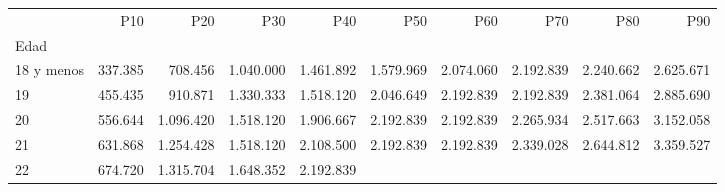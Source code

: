\begin{tabular}{llllllllll}
\cline{1-10}
\multicolumn{1}{c}{} &
  \multicolumn{1}{|r}{P10} &
  \multicolumn{1}{r}{P20} &
  \multicolumn{1}{r}{P30} &
  \multicolumn{1}{r}{P40} &
  \multicolumn{1}{r}{P50} &
  \multicolumn{1}{r}{P60} &
  \multicolumn{1}{r}{P70} &
  \multicolumn{1}{r}{P80} &
  \multicolumn{1}{r}{P90} \\
\cline{1-10}
\multicolumn{1}{l}{Edad} &
  \multicolumn{1}{|r}{} &
  \multicolumn{1}{r}{} &
  \multicolumn{1}{r}{} &
  \multicolumn{1}{r}{} &
  \multicolumn{1}{r}{} &
  \multicolumn{1}{r}{} &
  \multicolumn{1}{r}{} &
  \multicolumn{1}{r}{} &
  \multicolumn{1}{r}{} \\
\multicolumn{1}{l}{\hspace{1em}18 y menos} &
  \multicolumn{1}{|r}{337.385} &
  \multicolumn{1}{r}{708.456} &
  \multicolumn{1}{r}{1.040.000} &
  \multicolumn{1}{r}{1.461.892} &
  \multicolumn{1}{r}{1.579.969} &
  \multicolumn{1}{r}{2.074.060} &
  \multicolumn{1}{r}{2.192.839} &
  \multicolumn{1}{r}{2.240.662} &
  \multicolumn{1}{r}{2.625.671} \\
\multicolumn{1}{l}{\hspace{1em}19} &
  \multicolumn{1}{|r}{455.435} &
  \multicolumn{1}{r}{910.871} &
  \multicolumn{1}{r}{1.330.333} &
  \multicolumn{1}{r}{1.518.120} &
  \multicolumn{1}{r}{2.046.649} &
  \multicolumn{1}{r}{2.192.839} &
  \multicolumn{1}{r}{2.192.839} &
  \multicolumn{1}{r}{2.381.064} &
  \multicolumn{1}{r}{2.885.690} \\
\multicolumn{1}{l}{\hspace{1em}20} &
  \multicolumn{1}{|r}{556.644} &
  \multicolumn{1}{r}{1.096.420} &
  \multicolumn{1}{r}{1.518.120} &
  \multicolumn{1}{r}{1.906.667} &
  \multicolumn{1}{r}{2.192.839} &
  \multicolumn{1}{r}{2.192.839} &
  \multicolumn{1}{r}{2.265.934} &
  \multicolumn{1}{r}{2.517.663} &
  \multicolumn{1}{r}{3.152.058} \\
\multicolumn{1}{l}{\hspace{1em}21} &
  \multicolumn{1}{|r}{631.868} &
  \multicolumn{1}{r}{1.254.428} &
  \multicolumn{1}{r}{1.518.120} &
  \multicolumn{1}{r}{2.108.500} &
  \multicolumn{1}{r}{2.192.839} &
  \multicolumn{1}{r}{2.192.839} &
  \multicolumn{1}{r}{2.339.028} &
  \multicolumn{1}{r}{2.644.812} &
  \multicolumn{1}{r}{3.359.527} \\
\multicolumn{1}{l}{\hspace{1em}22} &
  \multicolumn{1}{|r}{674.720} &
  \multicolumn{1}{r}{1.315.704} &
  \multicolumn{1}{r}{1.648.352} &
  \multicolumn{1}{r}{2.192.839} &

\end{tabular}
